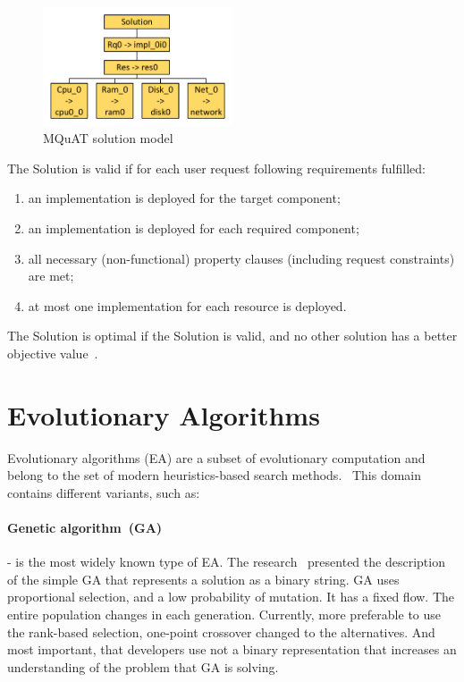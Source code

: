 \begin{figure}
	\centering
	\includegraphics[width=0.5\textwidth]{images/MQuATSolutionModel.pdf}
	\caption[MQuAT solution model]{MQuAT solution model}
	\label{fig:SolutionModel}
\end{figure}


The Solution is valid if for each user request following requirements fulfilled:
\begin{enumerate}
	\item an implementation is deployed for the target component;
	\item an implementation is deployed for each required component;
	\item all necessary (non-functional) property clauses (including request constraints) are met;
	\item at most one implementation for each resource is deployed.
\end{enumerate}

The Solution is optimal if the Solution is valid, and no other solution has a better objective value~\cite{gotz18}.

\section{Evolutionary Algorithms}
\label{sec:GeneticAlgorithm}

Evolutionary algorithms (EA) are a subset of evolutionary computation and belong to the set of modern heuristics-based search methods.~\cite{vikhar16}
This domain contains different variants, such as:
\paragraph{Genetic algorithm~(GA)} - is the most widely known type of EA\cite{eiben03}. The research~\cite{deJong75} presented the description of the simple GA that represents a solution as a binary string. GA uses proportional selection, and a low probability of mutation. It has a fixed flow. The entire population changes in each generation. Currently, more preferable to use the rank-based selection, one-point crossover changed to the alternatives. And most important, that developers use not a binary representation that increases an understanding of the problem that GA is solving.
